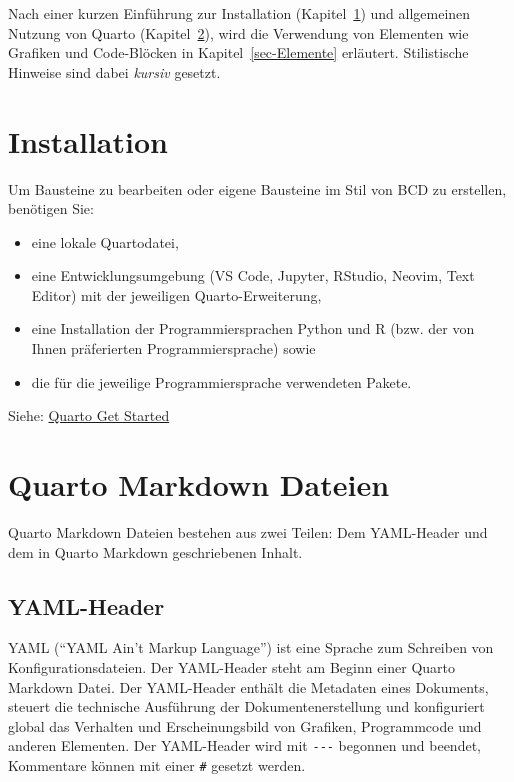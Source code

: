 \documentclass[
  letterpaper,
  DIV=11]{scrartcl}
\providecommand{\tightlist}{%
  \setlength{\itemsep}{0pt}\setlength{\parskip}{0pt}}\usepackage{longtable,booktabs,array}
\begin{document}
Nach einer kurzen Einführung zur Installation
(Kapitel~\ref{sec-Installation}) und allgemeinen Nutzung von Quarto
(Kapitel~\ref{sec-Quarto-Markdown-Dateien}), wird die Verwendung von
Elementen wie Grafiken und Code-Blöcken in Kapitel~\ref{sec-Elemente}
erläutert. Stilistische Hinweise sind dabei \emph{kursiv} gesetzt.

\section{Installation}\label{sec-Installation}

Um Bausteine zu bearbeiten oder eigene Bausteine im Stil von BCD zu
erstellen, benötigen Sie:

\begin{itemize}
\tightlist
\item
  eine lokale Quartodatei,
\item
  eine Entwicklungsumgebung (VS Code, Jupyter, RStudio, Neovim, Text
  Editor) mit der jeweiligen Quarto-Erweiterung,
\item
  eine Installation der Programmiersprachen Python und R (bzw. der von
  Ihnen präferierten Programmiersprache) sowie
\item
  die für die jeweilige Programmiersprache verwendeten Pakete.
\end{itemize}

Siehe: \href{https://quarto.org/docs/get-started/}{Quarto Get Started}

\section{Quarto Markdown Dateien}\label{sec-Quarto-Markdown-Dateien}

Quarto Markdown Dateien bestehen aus zwei Teilen: Dem YAML-Header und
dem in Quarto Markdown geschriebenen Inhalt.

\subsection{YAML-Header}\label{yaml-header}

YAML (``YAML Ain't Markup Language'') ist eine Sprache zum Schreiben von
Konfigurationsdateien. Der YAML-Header steht am Beginn einer Quarto
Markdown Datei. Der YAML-Header enthält die Metadaten eines Dokuments,
steuert die technische Ausführung der Dokumentenerstellung und
konfiguriert global das Verhalten und Erscheinungsbild von Grafiken,
Programmcode und anderen Elementen. Der YAML-Header wird mit
\texttt{-\/-\/-} begonnen und beendet, Kommentare können mit einer
\texttt{\#} gesetzt werden.
\end{document}
